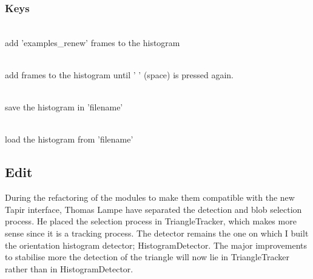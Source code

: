 \subsubsection{Keys}
\label{sec:ohd:howto:keys}
    \begin{description} \itemindent=-15pt
        \item['+'] \hfill \\ add 'examples\_renew' frames to the histogram
        \item[' ' (space)] \hfill \\ add frames to the histogram until ' ' (space) is pressed again.
        \item['s'] \hfill \\ save the histogram in 'filename'
        \item['l'] \hfill \\ load the histogram from 'filename' 
    \end{description}

\subsection{Edit}
\label{sec:ohd:edit}
During the refactoring of the modules to make them compatible with the 
new Tapir interface, Thomas Lampe have separated the detection and blob 
selection process. He placed the selection process in TriangleTracker, 
which makes more sense since it is a tracking process. The detector 
remains the one on which I built the orientation histogram detector; 
HistogramDetector. The major improvements to stabilise more the detection 
of the triangle will now lie in TriangleTracker rather than in 
HistogramDetector.
